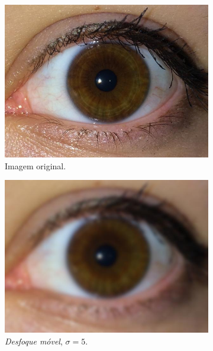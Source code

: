 \begin{figure}[H]
\centering
\begin{subfigure}{0.25\textwidth}
  \includegraphics[width=\linewidth]{img/Resultados/ruidos/original.jpg}
  \caption{Imagem original.}
\end{subfigure}\vfil
\centering %
\begin{subfigure}{0.25\textwidth}
  \includegraphics[width=\linewidth]{img/Resultados/ruidos/gaussian5.jpg}
  \caption{\textit{Desfoque móvel}, $\sigma=5$.}
\end{subfigure}\hfil %
\begin{subfigure}{0.25\textwidth}

\end{subfigure}
\end{figure}
